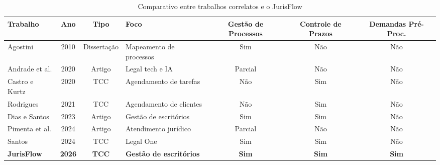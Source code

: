\begin{table}[htb]
\centering
\caption{Comparativo entre trabalhos correlatos e o JurisFlow}
\label{tab:comparativo}
\footnotesize
\begin{tabularx}{\textwidth}{@{}p{2.2cm} c c X c c c@{}}
\toprule
\textbf{Trabalho} & \textbf{Ano} & \textbf{Tipo} & \textbf{Foco} & \textbf{Gestão de Processos} & \textbf{Controle de Prazos} & \textbf{Demandas Pré-Proc.} \\
\midrule
Agostini & 2010 & Dissertação & Mapeamento de processos & Sim & Não & Não \\
Andrade et al. & 2020 & Artigo & Legal tech e IA & Parcial & Não & Não \\
Castro e Kurtz & 2020 & TCC & Agendamento de tarefas & Não & Sim & Não \\
Rodrigues & 2021 & TCC & Agendamento de clientes & Não & Sim & Não \\
Dias e Santos & 2023 & Artigo & Gestão de escritórios & Sim & Sim & Não \\
Pimenta et al. & 2024 & Artigo & Atendimento jurídico & Parcial & Não & Não \\
Santos & 2024 & TCC & Legal One & Sim & Sim & Não \\
\textbf{JurisFlow} & \textbf{2026} & \textbf{TCC} & \textbf{Gestão de escritórios} & \textbf{Sim} & \textbf{Sim} & \textbf{Sim} \\
\bottomrule
\end{tabularx}
\vspace*{0.2cm}
{\raggedright {}}
\end{table}